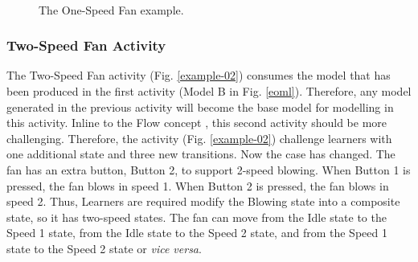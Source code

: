 \documentclass[conference]{IEEEtran}
\begin{document}
\begin{figure}[th]
    \centering
    \\
	\caption{The One-Speed Fan example.}
    \label{example-01}
\end{figure}

\subsubsection{Two-Speed Fan Activity}
The Two-Speed Fan activity (Fig. \ref{example-02}) consumes the model that has been produced in the first activity (Model B in Fig. \ref{eoml}). Therefore, any model generated in the previous activity will become the base model for modelling in this activity. Inline to the Flow concept \cite{csikszentmihalyi2014toward}, this second activity should be more challenging. Therefore, the activity (Fig. \ref{example-02}) challenge learners with one additional state and three new transitions. Now the case has changed. The fan has an extra button, Button 2, to support 2-speed blowing. When Button 1 is pressed, the fan blows in speed 1. When Button 2 is pressed, the fan blows in speed 2. Thus, Learners are required modify the Blowing state into a composite state, so it has two-speed states. The fan can move from the Idle state to the Speed 1 state, from the Idle state to the Speed 2 state, and from the Speed 1 state to the Speed 2 state or \textit{vice versa}.
\end{document}
